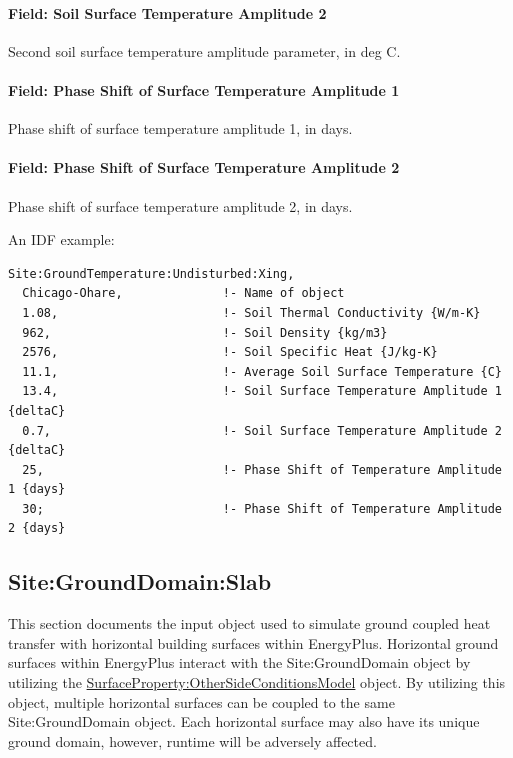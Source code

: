 \paragraph{Field: Soil Surface Temperature Amplitude 2}\label{field-soil-surface-temperature-amplitude-2}

Second soil surface temperature amplitude parameter, in deg C.

\paragraph{Field: Phase Shift of Surface Temperature Amplitude 1}\label{field-phase-shift-of-surface-temperature-amplitude-1}

Phase shift of surface temperature amplitude 1, in days.

\paragraph{Field: Phase Shift of Surface Temperature Amplitude 2}\label{field-phase-shift-of-surface-temperature-amplitude-2}

Phase shift of surface temperature amplitude 2, in days.

An IDF example:

\begin{lstlisting}
Site:GroundTemperature:Undisturbed:Xing,
  Chicago-Ohare,              !- Name of object
  1.08,                       !- Soil Thermal Conductivity {W/m-K}
  962,                        !- Soil Density {kg/m3}
  2576,                       !- Soil Specific Heat {J/kg-K}
  11.1,                       !- Average Soil Surface Temperature {C}
  13.4,                       !- Soil Surface Temperature Amplitude 1 {deltaC}
  0.7,                        !- Soil Surface Temperature Amplitude 2 {deltaC}
  25,                         !- Phase Shift of Temperature Amplitude 1 {days}
  30;                         !- Phase Shift of Temperature Amplitude 2 {days}
\end{lstlisting}

\subsection{Site:GroundDomain:Slab}\label{sitegrounddomainslab}

This section documents the input object used to simulate ground coupled heat transfer with horizontal building surfaces within EnergyPlus. Horizontal ground surfaces within EnergyPlus interact with the Site:GroundDomain object by utilizing the \hyperref[surfacepropertyothersideconditionsmodel]{SurfaceProperty:OtherSideConditionsModel} object. By utilizing this object, multiple horizontal surfaces can be coupled to the same Site:GroundDomain object. Each horizontal surface may also have its unique ground domain, however, runtime will be adversely affected.

